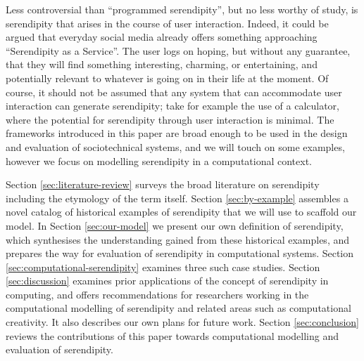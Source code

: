 Less controversial than ``programmed serendipity'', but no less worthy
of study, is serendipity that arises in the course of user
interaction.  Indeed, it could be argued that everyday social media
already offers something approaching ``Serendipity as a Service''.
The user logs on hoping, but without any guarantee, that they will
find something interesting, charming, or entertaining, and potentially
relevant to whatever is going on in their life at the moment.
Of course, it should not be assumed that any system that can accommodate
user interaction can generate serendipity; take for example the use of
a calculator, where the potential for serendipity through user
interaction is minimal.  The frameworks introduced in this paper are
broad enough to be used in the design and evaluation of sociotechnical
systems, and we will touch on some examples, however we focus on
modelling serendipity in a computational context.

Section \ref{sec:literature-review} surveys the broad literature on
serendipity including the etymology of the term itself.  Section
\ref{sec:by-example} assembles a novel catalog of historical examples
of serendipity that we will use to scaffold our model.  In Section
\ref{sec:our-model} we present our own definition of serendipity,
which synthesises the understanding gained from these historical
examples, and prepares the way for evaluation of serendipity in
computational systems.  Section \ref{sec:computational-serendipity}
examines three such case studies.  Section \ref{sec:discussion}
examines prior applications of the concept of serendipity in
computing, and offers recommendations for researchers working in the
computational modelling of serendipity and related areas such as
computational creativity.  It also describes our own plans for future
work.  Section \ref{sec:conclusion} reviews the contributions of this
paper towards computational modelling and evaluation of serendipity.


